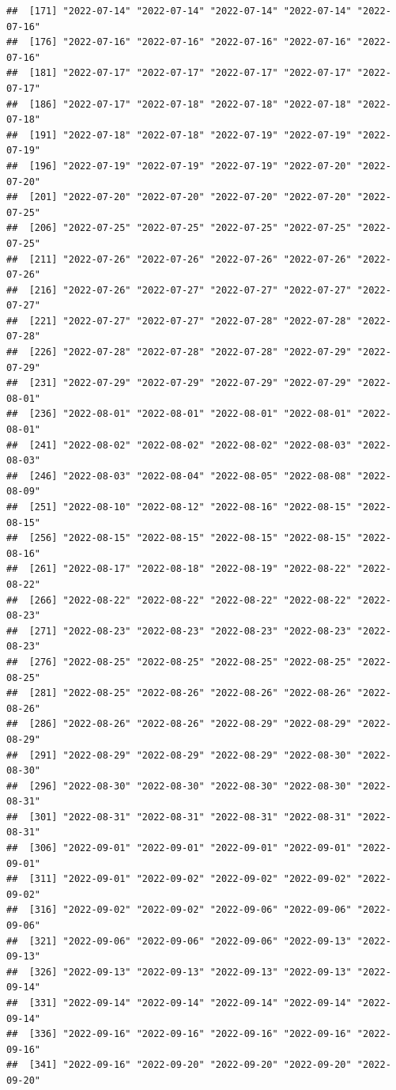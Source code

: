 \documentclass[
]{article}
\begin{document}
\begin{verbatim}
##  [171] "2022-07-14" "2022-07-14" "2022-07-14" "2022-07-14" "2022-07-16"
##  [176] "2022-07-16" "2022-07-16" "2022-07-16" "2022-07-16" "2022-07-16"
##  [181] "2022-07-17" "2022-07-17" "2022-07-17" "2022-07-17" "2022-07-17"
##  [186] "2022-07-17" "2022-07-18" "2022-07-18" "2022-07-18" "2022-07-18"
##  [191] "2022-07-18" "2022-07-18" "2022-07-19" "2022-07-19" "2022-07-19"
##  [196] "2022-07-19" "2022-07-19" "2022-07-19" "2022-07-20" "2022-07-20"
##  [201] "2022-07-20" "2022-07-20" "2022-07-20" "2022-07-20" "2022-07-25"
##  [206] "2022-07-25" "2022-07-25" "2022-07-25" "2022-07-25" "2022-07-25"
##  [211] "2022-07-26" "2022-07-26" "2022-07-26" "2022-07-26" "2022-07-26"
##  [216] "2022-07-26" "2022-07-27" "2022-07-27" "2022-07-27" "2022-07-27"
##  [221] "2022-07-27" "2022-07-27" "2022-07-28" "2022-07-28" "2022-07-28"
##  [226] "2022-07-28" "2022-07-28" "2022-07-28" "2022-07-29" "2022-07-29"
##  [231] "2022-07-29" "2022-07-29" "2022-07-29" "2022-07-29" "2022-08-01"
##  [236] "2022-08-01" "2022-08-01" "2022-08-01" "2022-08-01" "2022-08-01"
##  [241] "2022-08-02" "2022-08-02" "2022-08-02" "2022-08-03" "2022-08-03"
##  [246] "2022-08-03" "2022-08-04" "2022-08-05" "2022-08-08" "2022-08-09"
##  [251] "2022-08-10" "2022-08-12" "2022-08-16" "2022-08-15" "2022-08-15"
##  [256] "2022-08-15" "2022-08-15" "2022-08-15" "2022-08-15" "2022-08-16"
##  [261] "2022-08-17" "2022-08-18" "2022-08-19" "2022-08-22" "2022-08-22"
##  [266] "2022-08-22" "2022-08-22" "2022-08-22" "2022-08-22" "2022-08-23"
##  [271] "2022-08-23" "2022-08-23" "2022-08-23" "2022-08-23" "2022-08-23"
##  [276] "2022-08-25" "2022-08-25" "2022-08-25" "2022-08-25" "2022-08-25"
##  [281] "2022-08-25" "2022-08-26" "2022-08-26" "2022-08-26" "2022-08-26"
##  [286] "2022-08-26" "2022-08-26" "2022-08-29" "2022-08-29" "2022-08-29"
##  [291] "2022-08-29" "2022-08-29" "2022-08-29" "2022-08-30" "2022-08-30"
##  [296] "2022-08-30" "2022-08-30" "2022-08-30" "2022-08-30" "2022-08-31"
##  [301] "2022-08-31" "2022-08-31" "2022-08-31" "2022-08-31" "2022-08-31"
##  [306] "2022-09-01" "2022-09-01" "2022-09-01" "2022-09-01" "2022-09-01"
##  [311] "2022-09-01" "2022-09-02" "2022-09-02" "2022-09-02" "2022-09-02"
##  [316] "2022-09-02" "2022-09-02" "2022-09-06" "2022-09-06" "2022-09-06"
##  [321] "2022-09-06" "2022-09-06" "2022-09-06" "2022-09-13" "2022-09-13"
##  [326] "2022-09-13" "2022-09-13" "2022-09-13" "2022-09-13" "2022-09-14"
##  [331] "2022-09-14" "2022-09-14" "2022-09-14" "2022-09-14" "2022-09-14"
##  [336] "2022-09-16" "2022-09-16" "2022-09-16" "2022-09-16" "2022-09-16"
##  [341] "2022-09-16" "2022-09-20" "2022-09-20" "2022-09-20" "2022-09-20"

\end{verbatim}
\end{document}
